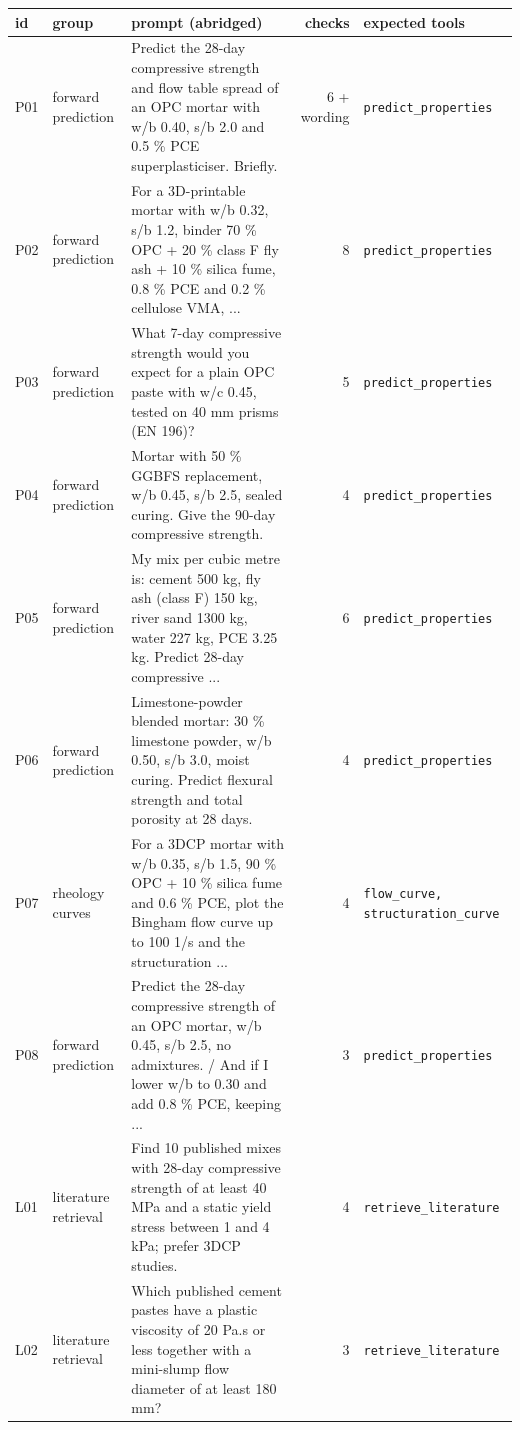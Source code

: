 \begin{tabular}{llp{8.6cm}rl}
\toprule
id & group & prompt (abridged) & checks & expected tools \\
\midrule
P01 & forward prediction & Predict the 28-day compressive strength and flow table spread of an OPC mortar with w/b 0.40, s/b 2.0 and 0.5 \% PCE superplasticiser. Briefly. & 6 + wording & \texttt{predict\_properties} \\
P02 & forward prediction & For a 3D-printable mortar with w/b 0.32, s/b 1.2, binder 70 \% OPC + 20 \% class F fly ash + 10 \% silica fume, 0.8 \% PCE and 0.2 \% cellulose VMA, ... & 8 & \texttt{predict\_properties} \\
P03 & forward prediction & What 7-day compressive strength would you expect for a plain OPC paste with w/c 0.45, tested on 40 mm prisms (EN 196)? & 5 & \texttt{predict\_properties} \\
P04 & forward prediction & Mortar with 50 \% GGBFS replacement, w/b 0.45, s/b 2.5, sealed curing. Give the 90-day compressive strength. & 4 & \texttt{predict\_properties} \\
P05 & forward prediction & My mix per cubic metre is: cement 500 kg, fly ash (class F) 150 kg, river sand 1300 kg, water 227 kg, PCE 3.25 kg. Predict 28-day compressive ... & 6 & \texttt{predict\_properties} \\
P06 & forward prediction & Limestone-powder blended mortar: 30 \% limestone powder, w/b 0.50, s/b 3.0, moist curing. Predict flexural strength and total porosity at 28 days. & 4 & \texttt{predict\_properties} \\
P07 & rheology curves & For a 3DCP mortar with w/b 0.35, s/b 1.5, 90 \% OPC + 10 \% silica fume and 0.6 \% PCE, plot the Bingham flow curve up to 100 1/s and the structuration ... & 4 & \texttt{flow\_curve, structuration\_curve} \\
P08 & forward prediction & Predict the 28-day compressive strength of an OPC mortar, w/b 0.45, s/b 2.5, no admixtures. / And if I lower w/b to 0.30 and add 0.8 \% PCE, keeping ... & 3 & \texttt{predict\_properties} \\
L01 & literature retrieval & Find 10 published mixes with 28-day compressive strength of at least 40 MPa and a static yield stress between 1 and 4 kPa; prefer 3DCP studies. & 4 & \texttt{retrieve\_literature} \\
L02 & literature retrieval & Which published cement pastes have a plastic viscosity of 20 Pa.s or less together with a mini-slump flow diameter of at least 180 mm? & 3 & \texttt{retrieve\_literature} \\

\end{tabular}
